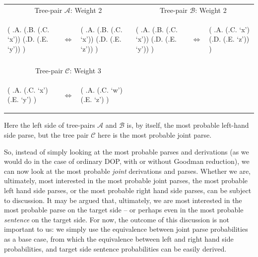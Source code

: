 \documentclass[a4paper]{article}
\theoremstyle{definition}
\begin{document}
\begin{tabular}{llllll}
\multicolumn{3}{c}{Tree-pair $\mathcal{A}$: Weight 2} &
\multicolumn{3}{c}{Tree-pair $\mathcal{B}$: Weight 2} \\
\begin{parsetree}
( .A.
    (.B. (.C. `x'))
    (.D. (.E. `y'))
)
\end{parsetree}
& $\iff$ &
\begin{parsetree}
( .A.
    (.B. (.C. `x'))
    (.D. (.E. `z'))
)
\end{parsetree}
&
\begin{parsetree}
( .A.
    (.B. (.C. `x'))
    (.D. (.E. `y'))
)
\end{parsetree}
& $\iff$ &
\begin{parsetree}
( .A.
    (.C. `x')
    (.D. (.E. `z'))
)
\end{parsetree} \\
& & \\
\multicolumn{3}{c}{Tree-pair $\mathcal{C}$: Weight 3} & \\
\begin{parsetree}
( .A.
    (.C. `x')
    (.E. `y')
)
\end{parsetree}
& $\iff$ &
\begin{parsetree}
( .A.
    (.C. `w')
    (.E. `z')
)
\end{parsetree}

\end{tabular}
\vspace{1em}

Here the left side of tree-pairs $\mathcal{A}$ and $\mathcal{B}$ is, by itself, the
most probable left-hand side parse, but the tree pair $\mathcal{C}$ here is the
most probable joint parse.

So, instead of simply looking at the most probable parses and derivations (as we would do in the case of ordinary DOP, with or without Goodman reduction), we can now look at the most probable \emph{joint} derivations and parses. Whether we are, ultimately, most interested in the most probable joint parses, the most probable left hand side parses, or the most probable right hand side parses, can be subject to discussion. It may be argued that, ultimately, we are most interested in the most probable parse on the target side -- or perhaps even in the most probable \emph{sentence} on the target side. For now, the outcome of this discussion is not important to us: we simply use the equivalence between joint parse probabilities as a base case, from which the equivalence between left and right hand side probabilities, and target side sentence probabilities can be easily derived.
\end{document}

